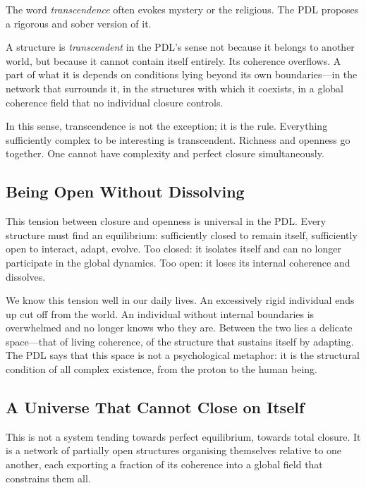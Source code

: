 \documentclass[12pt, a4paper, openright]{book}
\begin{document}
The word \emph{transcendence} often evokes mystery or the religious. The PDL proposes a rigorous and sober version of it.

\medskip

A structure is \emph{transcendent} in the PDL's sense not because it belongs to another world, but because it cannot contain itself entirely. Its coherence overflows. A part of what it is depends on conditions lying beyond its own boundaries---in the network that surrounds it, in the structures with which it coexists, in a global coherence field that no individual closure controls.

\medskip

In this sense, transcendence is not the exception; it is the rule. Everything sufficiently complex to be interesting is transcendent. Richness and openness go together. One cannot have complexity and perfect closure simultaneously.

\subsection*{Being Open Without Dissolving}

This tension between closure and openness is universal in the PDL. Every structure must find an equilibrium: sufficiently closed to remain itself, sufficiently open to interact, adapt, evolve. Too closed: it isolates itself and can no longer participate in the global dynamics. Too open: it loses its internal coherence and dissolves.

\medskip

We know this tension well in our daily lives. An excessively rigid individual ends up cut off from the world. An individual without internal boundaries is overwhelmed and no longer knows who they are. Between the two lies a delicate space---that of living coherence, of the structure that sustains itself by adapting. The PDL says that this space is not a psychological metaphor: it is the structural condition of all complex existence, from the proton to the human being.

\subsection*{A Universe That Cannot Close on Itself}

This is not a system tending towards perfect equilibrium, towards total closure. It is a network of partially open structures organising themselves relative to one another, each exporting a fraction of its coherence into a global field that constrains them all.
\end{document}
